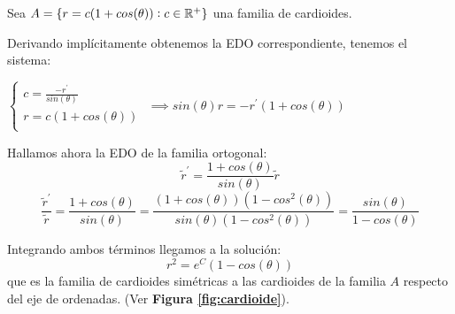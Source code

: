 \begin{example}
Sea $A = \{ r=c(1+cos(\theta)) : c \in \mathbb{R}^+ \}$ una familia de cardioides.

Derivando implícitamente obtenemos la EDO correspondiente, tenemos el sistema:
\begin{center}
$
\left\lbrace
  \begin{array}{l}
     c = \frac{-r^\prime}{sin(\theta)} \\
     r = c(1+cos(\theta))  \\
  \end{array}
\right.
$
$\implies sin(\theta)r = -r^\prime(1+cos(\theta))$
\end{center}
Hallamos ahora la EDO de la familia ortogonal:
$$\tilde{r}^\prime = \frac{1+cos(\theta)}{sin(\theta)}\tilde{r}$$
$$\frac{\tilde{r}^\prime}{\tilde{r}} = \frac{1+cos(\theta)}{sin(\theta)} = \frac{(1+cos(\theta))(1-cos^2(\theta))}{sin(\theta)(1-cos^2(\theta))} = \frac{sin(\theta)}{1-cos(\theta)}$$

Integrando ambos términos llegamos a la solución: 
$$r^2 = e^C(1-cos(\theta))$$
que es la familia de cardioides simétricas a las cardioides de la familia $A$ respecto del eje de ordenadas. (Ver \textbf{Figura \ref{fig:cardioide}}).
\end{example}

